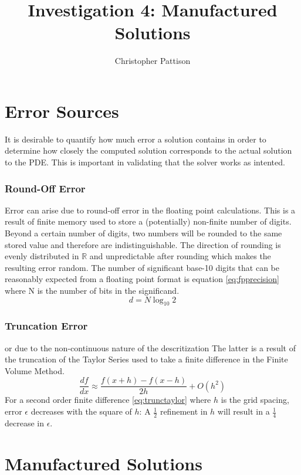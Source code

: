 \documentclass[12pt,twocolumn]{article}
\title{\vspace{-2.5em}Investigation 4: Manufactured Solutions}
\author{Christopher Pattison}
\date{}
\begin{document}
\maketitle
\section*{Error Sources}

It is desirable to quantify how much error a solution contains in order to determine how closely the computed solution
corresponds to the actual solution to the PDE. This is important in validating that the solver works as intented.

\subsubsection*{Round-Off Error} Error can arise due to round-off error in the floating point calculations. This is a result
of finite memory used to store a (potentially) non-finite number of digits. Beyond a certain number of digits, two numbers will be
rounded to the same stored value and therefore are indistinguishable. The direction of rounding is evenly distributed in $\mathbb{R}$
and unpredictable after rounding which makes the resulting error random. The number of significant base-10 digits that can be reasonably expected from a floating point format is
equation \eqref{eq:fpprecision} where N is the number of bits in the significand.
\begin{equation}\label{eq:fpprecision}d = N\log_{10}2\end{equation}

\subsubsection*{Truncation Error}
or due to the non-continuous nature of the descritization The latter is a result of the truncation of the Taylor Series
used to take a finite difference in the Finite Volume Method.
\begin{equation}\label{eq:trunctaylor}\frac{df}{dx}\approx \frac{f(x+h)-f(x-h)}{2h}+O(h^2)\end{equation}
For a second order finite difference \eqref{eq:trunctaylor} where $h$ is the grid spacing, error $\epsilon$ decreases with the square of $h$: A $\frac 1 2$
refinement in $h$ will result in a $\frac 1 4$ decrease in $\epsilon$.

\section*{Manufactured Solutions}
\end{document}
